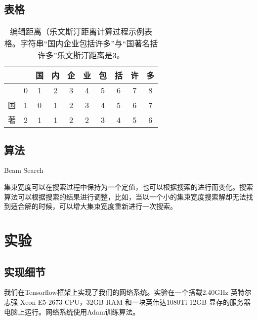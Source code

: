 \documentclass[winfonts]{njuthesis}
\begin{document}
\section{表格}

\begin{table}[htbp]
\setlength{\belowcaptionskip}{7pt}
  \centering
\begin{tabular}{|c|c|c|c|c|c|c|c|c|c|}
\hline 
  &   & 国 & 内 & 企 & 业 & 包 & 括 & 许 & 多 \\ 
\hline 
  & 0 & 1 & 2 & 3 & 4 & 5 & 6 & 7 & 8 \\ 
\hline 
国 & 1 & 0 & 1 & 2 & 3 & 4 & 5 & 6 & 7 \\ 
\hline 
著 & 2 & 1 & 1 & 2 & 2 & 3 & 4 & 5 & 6 \\ 
\hline
\end{tabular} 
\vspace{0.2cm}
  \caption{编辑距离（乐文斯汀距离计算过程示例表格。字符串``国内企业包括许多''与``国著名括许多''乐文斯汀距离是3。}\label{table:ld}
\end{table}


\section{算法}

\begin{algorithm}
\caption{Beam Search}
\label{alg:beam}
\begin{algorithmic}[1]
\ELSE 
{}
\ENDIF
\ENDWHILE
\end{algorithmic}
\end{algorithm}

集束宽度可以在搜索过程中保持为一个定值，也可以根据搜索的进行而变化。搜索算法可以根据搜索的结果进行调整，比如，当以一个小的集束宽度搜索解却无法找到适合解的时候，可以增大集束宽度重新进行一次搜索。



\chapter{实验}

\section{实现细节}
我们在Tensorflow框架上实现了我们的网络系统。实验在一个搭载2.40GHz 英特尔志强 Xeon E5-2673 CPU，32GB RAM 和一块英伟达1080Ti 12GB 显存的服务器电脑上运行。网络系统使用Adam训练算法。
\end{document}
